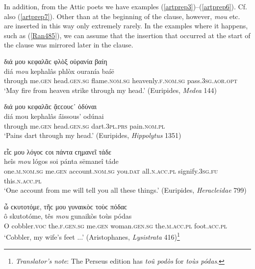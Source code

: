 In addition, from the Attic poets we have examples (\ref{artprep3})--(\ref{artprep6}). Cf. also (\ref{artprep7}). Other than at the beginning of the clause, however, \textit{mou} etc. are inserted in this way only extremely rarely. In the examples where it happens, such as (\ref{Ran485}), we can assume that the insertion that occurred at the start of the clause was mirrored later in the clause.

\begin{exe}
\ex διά μου κεφαλᾶϲ φλὸξ οὐρανία βαίη\\
\gll diá \emph{mou} kephalâs phlòx ouranía baíē\\
through me.\textsc{gen} head.\textsc{gen.sg} flame.\textsc{nom.sg}
heavenly.\textsc{f.nom.sg} pass.\textsc{3sg.aor.opt}\\
\trans `May fire from heaven strike through my head.' (Euripides, \textit{Medea} 144)
\label{artprep3}
\end{exe}

\begin{exe}
\ex διά μου κεφαλᾶϲ ᾄϲϲουϲ᾽ ὀδύναι\\
\gll diá mou kephalâs ā́issous' odúnai\\
through me.\textsc{gen} head.\textsc{gen.sg} dart.\textsc{3pl.prs} pain.\textsc{nom.pl}\\
\trans `Pains dart through my head.' (Euripides, \textit{Hippolytus} 1351)
\label{artprep4}
\end{exe}

\begin{exe}
\ex εἷϲ μου λόγοϲ ϲοι πάντα ϲημανεῖ τάδε\\
\gll heîs \emph{mou} lógos soi pánta sēmaneî táde\\
one.\textsc{m.nom.sg} me.\textsc{gen} account.\textsc{nom.sg} you.\textsc{dat} all.\textsc{n.acc.pl} signify.\textsc{3sg.fu} this.\textsc{n.acc.pl}\\
\trans `One account from me will tell you all these things.' (Euripides, \textit{Heracleidae} 799)
\label{artprep5}
\end{exe}

\begin{exe}
\ex ὦ ϲκυτοτόμε, τῆϲ μου γυναικὸϲ τοὺϲ πόδαϲ\\
\gll ô skutotóme, tês \emph{mou} gunaikòs toùs pódas\\
O cobbler.\textsc{voc} the.\textsc{f.gen.sg} me.\textsc{gen} woman.\textsc{gen.sg} the.\textsc{m.acc.pl} foot.\textsc{acc.pl}\\
\trans `Cobbler, my wife's feet ...' (Aristophanes, \textit{Lysistrata} 416)\footnote{\emph{Translator's note}: The Perseus edition has \textit{toû podòs} for \textit{toùs pódas}.}
\label{artprep6}
\end{exe}

